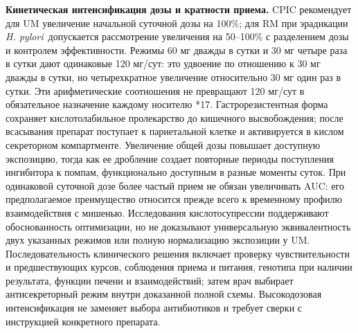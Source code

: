 \documentclass[11pt,a4paper,notitlepage]{report}
\newcommand{\Hp}{\textit{H. pylori}}
\newcommand{\src}[1]{\unskip\space\cite{#1}}
\begin{document}
\textbf{Кинетическая интенсификация дозы и кратности приема.} CPIC рекомендует для UM увеличение начальной суточной дозы на 100\%; для RM при эрадикации \Hp\ допускается рассмотрение увеличения на 50--100\% с разделением дозы и контролем эффективности. Режимы 60 мг дважды в сутки и 30 мг четыре раза в сутки дают одинаковые 120 мг/сут: это удвоение по отношению к 30 мг дважды в сутки, но четырехкратное увеличение относительно 30 мг один раз в сутки. Эти арифметические соотношения не превращают 120 мг/сут в обязательное назначение каждому носителю *17.\src{cpic,uslabel} Гастрорезистентная форма сохраняет кислотолабильное пролекарство до кишечного высвобождения; после всасывания препарат поступает к париетальной клетке и активируется в кислом секреторном компартменте. Увеличение общей дозы повышает доступную экспозицию, тогда как ее дробление создает повторные периоды поступления ингибитора к помпам, функционально доступным в разные моменты суток. При одинаковой суточной дозе более частый прием не обязан увеличивать AUC: его предполагаемое преимущество относится прежде всего к временному профилю взаимодействия с мишенью.\src{uslabel,molrestore,hpphblum1998,hpphfuruta2001} Исследования кислотосупрессии поддерживают обоснованность оптимизации, но не доказывают универсальную эквивалентность двух указанных режимов или полную нормализацию экспозиции у UM. Последовательность клинического решения включает проверку чувствительности и предшествующих курсов, соблюдения приема и питания, генотипа при наличии результата, функции печени и взаимодействий; затем врач выбирает антисекреторный режим внутри доказанной полной схемы. Высокодозовая интенсификация не заменяет выбора антибиотиков и требует сверки с инструкцией конкретного препарата.\src{acghp,cpic,uslabel}
\end{document}
